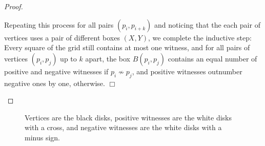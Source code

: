 \documentclass{llncs}
\begin{document}
\begin{proof}
\begin{itemize}
    Repeating this process for all pairs $(p_i,p_{i+k})$ and noticing
    that the each pair of vertices uses a pair of different boxes
    $(X,Y)$, we complete the inductive step: Every square of the grid
    still contains at most one witness, and for all pairs of vertices
    $(p_i,p_j)$ up to $k$ apart, the box $B(p_i,p_j)$ contains an
    equal number of positive and negative witnesses if $p_i \not\sim
    p_j$, and positive witnesses outnumber negative ones by one,
    otherwise.  \hfill $\Box$
  \end{itemize}
\end{proof}



\begin{figure}
\centering
{}
\hspace{0.2\linewidth}
  \caption{Vertices are the black disks, positive witnesses are the white disks with a cross, and negative witnesses are the white disks with a minus sign.}
  \label{WRG+-}
\end{figure}
\end{document}
